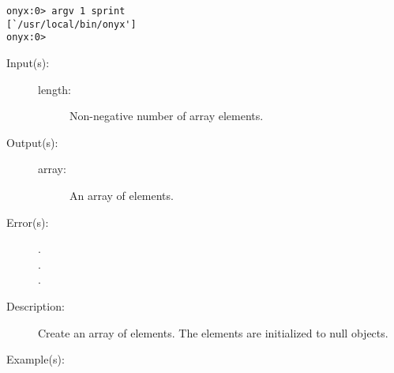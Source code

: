 \begin{description}
\begin{description}
\begin{verbatim}
onyx:0> argv 1 sprint
[`/usr/local/bin/onyx']
onyx:0>
		\end{verbatim}
	\end{description}
\label{systemdict:array}
\item[{\onyxop{length}{array}{array}}: ]
	\begin{description}\item[]
	\item[Input(s): ]
		\begin{description}\item[]
		\item[length: ]
			Non-negative number of array elements.
		\end{description}
	\item[Output(s): ]
		\begin{description}\item[]
		\item[array: ]
			An array of  elements.
		\end{description}
	\item[Error(s): ]
		\begin{description}\item[]
		\item[.]
		\item[.]
		\item[.]
		\end{description}
	\item[Description: ]
		Create an array of  elements.  The elements are
		initialized to null objects.
	\item[Example(s): ]\begin{verbatim}


\end{verbatim}
\end{description}
\end{description}
